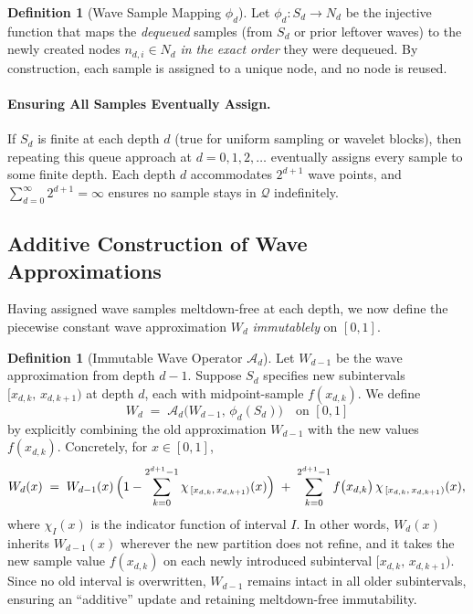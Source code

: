\documentclass[acmsmall]{acmart}
\theoremstyle{definition}
\newtheorem{definition}[theorem]{Definition}
\theoremstyle{remark}
\begin{document}
\begin{definition}[Wave Sample Mapping $\phi_d$]
  \label{def:phi-d}
  Let $\phi_d\colon S_d \to N_d$ be the injective function that maps the
  \emph{dequeued} samples (from $S_d$ or prior leftover waves) to the newly
  created nodes $n_{d,i}\in N_d$ \emph{in the exact order} they were dequeued.
  By construction, each sample is assigned to a unique node, and no node is reused.
\end{definition}

\paragraph{Ensuring All Samples Eventually Assign.}
If $S_d$ is finite at each depth $d$ (true for uniform sampling or wavelet blocks),
then repeating this queue approach at $d=0,1,2,\dots$ eventually assigns every sample
to some finite depth. Each depth $d$ accommodates $2^{d+1}$ wave points, and
$\sum_{d=0}^{\infty} 2^{d+1} = \infty$ ensures no sample stays in $\mathcal{Q}$
indefinitely.

\subsection{Additive Construction of Wave Approximations}
\label{subsec:wave-additive}

Having assigned wave samples meltdown-free at each depth, we now define the piecewise
constant wave approximation $W_d$ \emph{immutablely} on $[0,1]$.

\begin{definition}[Immutable Wave Operator $\mathcal{A}_d$]
  Let $W_{d-1}$ be the wave approximation from depth $d{-}1$. Suppose $S_d$
  specifies new subintervals $[x_{d,k},\,x_{d,k+1})$ at depth $d$, each with
  midpoint-sample $f(x_{d,k})$. We define
  \[
    W_d \;=\; \mathcal{A}_d\bigl(W_{d-1},\,\phi_d(S_d)\bigr)\quad \text{on }[0,1]
  \]
  by explicitly combining the old approximation $W_{d-1}$ with the new values
  $f(x_{d,k})$. Concretely, for $x \in [0,1]$,
  \[
    W_d(x)
    \;=\;
    W_{d-1}(x)\,\Bigl(1 - \sum_{k=0}^{2^{d+1}-1}\chi_{\,[x_{d,k},\,x_{d,k+1})}(x)\Bigr)
    \;+\;
    \sum_{k=0}^{2^{d+1}-1} f\bigl(x_{d,k}\bigr)\,\chi_{\,[x_{d,k},\,x_{d,k+1})}(x),
  \]
  where $\chi_{I}(x)$ is the indicator function of interval $I$. In other words,
  $W_d(x)$ inherits $W_{d-1}(x)$ wherever the new partition does not refine,
  and it takes the new sample value $f(x_{d,k})$ on each newly introduced
  subinterval $[x_{d,k},\,x_{d,k+1})$. Since no old interval is overwritten,
  $W_{d-1}$ remains intact in all older subintervals, ensuring an ``additive''
  update and retaining meltdown-free immutability.
\end{definition}
\end{document}
